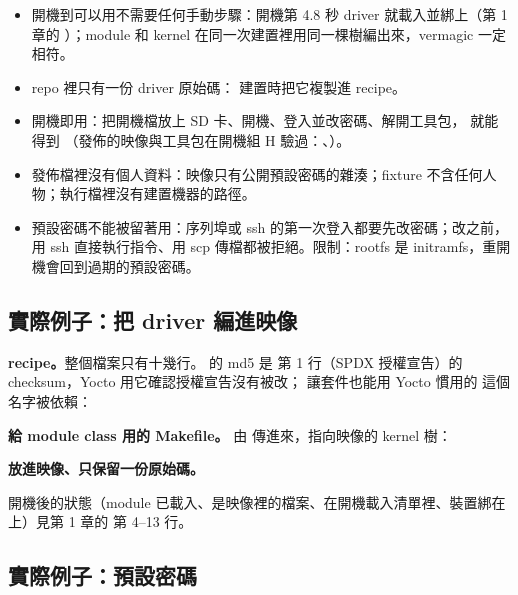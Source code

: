 \begin{gain}
\begin{itemize}
\item 開機到可以用不需要任何手動步驟：開機第 4.8 秒 driver 就載入並綁上（第 1 章的 ）；module 和 kernel 在同一次建置裡用同一棵樹編出來，vermagic 一定相符。
\item repo 裡只有一份 driver 原始碼： 建置時把它複製進 recipe。
\item 開機即用：把開機檔放上 SD 卡、開機、登入並改密碼、解開工具包， 就能得到 （發佈的映像與工具包在開機組 H 驗過：、）。
\item 發佈檔裡沒有個人資料：映像只有公開預設密碼的雜湊；fixture 不含任何人物；執行檔裡沒有建置機器的路徑。
\item 預設密碼不能被留著用：序列埠或 ssh 的第一次登入都要先改密碼；改之前，用 ssh 直接執行指令、用 scp 傳檔都被拒絕。限制：rootfs 是 initramfs，重開機會回到過期的預設密碼。
\end{itemize}
\end{gain}

\subsection{實際例子：把 driver 編進映像}

\textbf{recipe。}整個檔案只有十幾行。 的 md5 是  第 1 行（SPDX 授權宣告）的 checksum，Yocto 用它確認授權宣告沒有被改； 讓套件也能用 Yocto 慣用的  這個名字被依賴：


\textbf{給 module class 用的 Makefile。} 由  傳進來，指向映像的 kernel 樹：


\textbf{放進映像、只保留一份原始碼。}


開機後的狀態（module 已載入、是映像裡的檔案、在開機載入清單裡、裝置綁在  上）見第 1 章的  第 4--13 行。

\subsection{實際例子：預設密碼}

